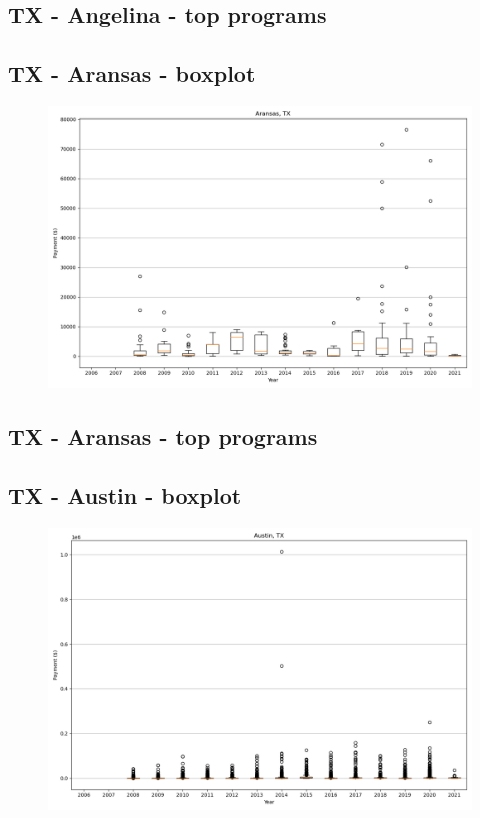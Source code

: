 \subsection*{TX - Angelina - top programs}

\newpage
\subsection*{TX - Aransas - boxplot}
\begin{figure}[h]
\centering
\includegraphics[width=7in]{../output/boxplots/counties/Aransas-TX_boxplot.png}
\end{figure}


\subsection*{TX - Aransas - top programs}

\newpage
\subsection*{TX - Austin - boxplot}
\begin{figure}[h]
\centering
\includegraphics[width=7in]{../output/boxplots/counties/Austin-TX_boxplot.png}
\end{figure}


